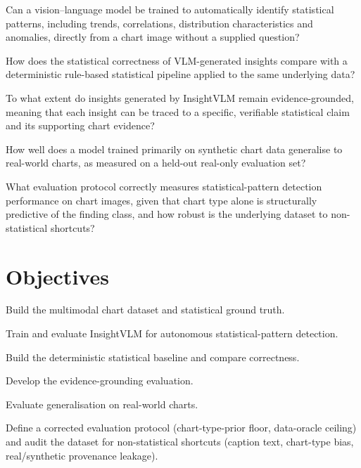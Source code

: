 \begin{description}[leftmargin=1.6cm,style=nextline,font=\bfseries]
  \item[RQ1.] Can a vision--language model be trained to automatically identify
  statistical patterns, including trends, correlations, distribution
  characteristics and anomalies, directly from a chart image without a supplied
  question?

  \item[RQ2.] How does the statistical correctness of VLM-generated insights
  compare with a deterministic rule-based statistical pipeline applied to the
  same underlying data?

  \item[RQ3.] To what extent do insights generated by InsightVLM remain
  evidence-grounded, meaning that each insight can be traced to a specific,
  verifiable statistical claim and its supporting chart evidence?

  \item[RQ4.] How well does a model trained primarily on synthetic chart data
  generalise to real-world charts, as measured on a held-out real-only
  evaluation set?

  \item[RQ5.] What evaluation protocol correctly measures statistical-pattern
  detection performance on chart images, given that chart type alone is
  structurally predictive of the finding class, and how robust is the underlying
  dataset to non-statistical shortcuts?
\end{description}

\section{Objectives}
\label{sec:objectives}

\begin{description}[leftmargin=1.2cm,style=nextline,font=\bfseries]
  \item[O1.] Build the multimodal chart dataset and statistical ground truth.
  \item[O2.] Train and evaluate InsightVLM for autonomous statistical-pattern
  detection.
  \item[O3.] Build the deterministic statistical baseline and compare
  correctness.
  \item[O4.] Develop the evidence-grounding evaluation.
  \item[O5.] Evaluate generalisation on real-world charts.
  \item[O6.] Define a corrected evaluation protocol (chart-type-prior floor,
  data-oracle ceiling) and audit the dataset for non-statistical shortcuts
  (caption text, chart-type bias, real/synthetic provenance leakage).
\end{description}

